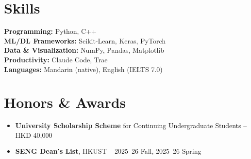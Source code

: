 \documentclass{common/resume}
\begin{document}
\section{Skills}

\textbf{Programming:} Python, C++ \\
\textbf{ML/DL Frameworks:} Scikit-Learn, Keras, PyTorch \\
\textbf{Data \& Visualization:} NumPy, Pandas, Matplotlib \\
\textbf{Productivity:} Claude Code, Trae \\
\textbf{Languages:} Mandarin (native), English (IELTS 7.0)

\section{Honors \& Awards}

\begin{itemize}
  \item \textbf{University Scholarship Scheme} for Continuing Undergraduate Students -- HKD 40,000
  \item \textbf{SENG Dean's List}, HKUST -- 2025--26 Fall, 2025--26 Spring
\end{itemize}
\end{document}
